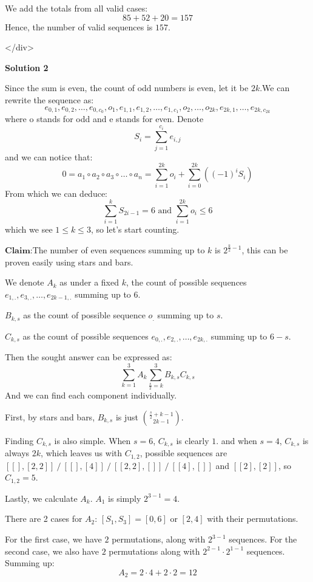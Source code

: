\begin{enumerate}
 
We add the totals from all valid cases:
 \[85 + 52 + 20 = 157\]Hence, the number of valid sequences is $\boxed{157}$.

 </div>



\textbf{Solution 2}

Since the sum is even, the count of odd numbers is even, let it be $2k$.We can rewrite the sequence as:
 \[e_{0, 1}, e_{0, 2}, \dots, e_{0, c_0}, o_1, e_{1, 1}, e_{1, 2}, \dots, e_{1, c_1}, o_2, \dots, o_{2k}, e_{2k, 1}, \dots, e_{2k, c_{2k}}\]where o stands for odd and e stands for even. Denote
 \[S_i= \sum_{j= 1}^{c_i} e_{i, j}\]and we can notice that:
 \[0= a_1 \circ a_2 \circ a_3 \circ \dots \circ a_n = \sum_{i= 1}^{2k} o_i+ \sum_{i= 0}^{2k} ((-1)^i S_i)\]From which we can deduce:
 \[\sum_{i= 1}^{k} S_{2i- 1}= 6 \text{ and }\sum_{i= 1}^{2k} o_i \leq 6\]which we see $1 \leq k \leq 3$, so let's start counting.

 $\textbf{Claim}$:The number of even sequences summing up to $k$ is $2^{\frac{k}{2}- 1}$, this can be proven easily using stars and bars.

 We denote $A_k$ as under a fixed $k$, the count of possible sequences $e_{1, .}, e_{3, .}, \dots, e_{2k- 1, .}$ summing up to $6$.

 $B_{k, s}$ as the count of possible sequence $o_{.}$ summing up to $s$.

 $C_{k, s}$ as the count of possible sequences $e_{0, .}, e_{2, .}, \ldots, e_{2k, .}$ summing up to $6- s$.

 Then the sought answer can be expressed as:
 \[\sum_{k= 1}^{3} A_k \sum_{\frac{s}{2}= k}^{3} B_{k, s}C_{k, s}\]And we can find each component individually.

 First, by stars and bars, $B_{k, s}$ is just $\binom{\frac{s}{2}+ k- 1}{2k- 1}$.

 Finding $C_{k, s}$ is also simple. When $s= 6$, $C_{k, s}$ is clearly $1$. and when $s= 4$, $C_{k, s}$ is always $2k$, which leaves us with $C_{1, 2}$, possible sequences are $[[], [2, 2]]\  / \ [[], [4]]\ / \ [[2, 2], []]\ / \ [[4], []]$ and $[[2], [2]]$, so $C_{1, 2}= 5$.

 Lastly, we calculate $A_k$. $A_1$ is simply $2^{3- 1}= 4$.

 There are 2 cases for $A_2$: $[S_1, S_3]= [0, 6]$ or $[2, 4]$ with their permutations.

 For the first case, we have $2$ permutations, along with $2^{3- 1}$ sequences. For the second case, we also have $2$ permutations along with $2^{2- 1} \cdot 2^{1- 1}$ sequences. Summing up:
 \[A_2= 2 \cdot 4+ 2 \cdot 2= 12\]


\end{enumerate}
